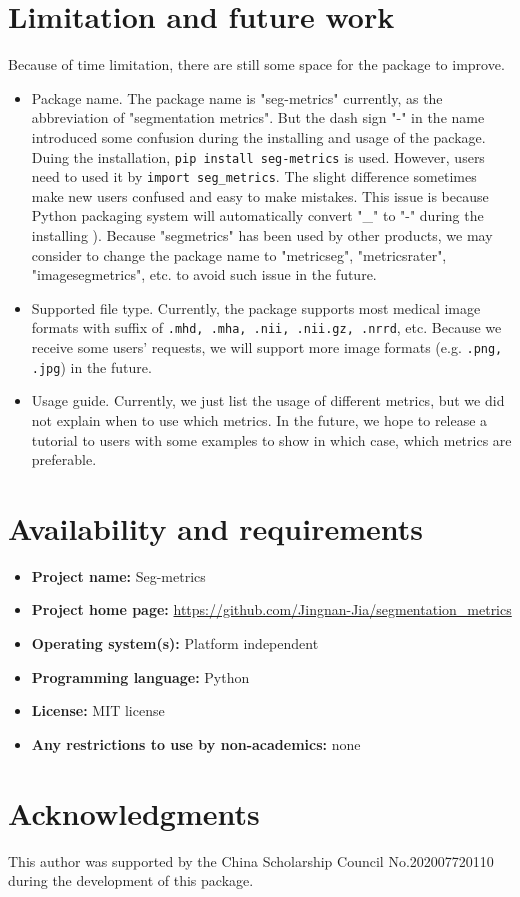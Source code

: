 \section{Limitation and future work}
Because of time limitation, there are still some space for the package to improve. 
\begin{itemize}
    \item Package name. The package name is "seg-metrics" currently, as the abbreviation of "segmentation metrics". But the dash sign "-" in the name introduced some confusion during the installing and usage of the package. Duing the installation, \texttt{pip install seg-metrics} is used. However, users need to used it by \texttt{import seg\_metrics}. The slight difference sometimes make new users confused and easy to make mistakes. This issue is because Python packaging system will automatically convert "\_" to "-" during the installing \cite{dash_underscore_email, dash_underscore_google, dash_underscore_overflow}). Because "segmetrics" has been used by other products, we may consider to change the package name to "metricseg", "metricsrater", "imagesegmetrics", etc. to avoid such issue in the future.
    
    \item Supported file type. Currently, the package supports most medical image formats with suffix of \texttt{.mhd, .mha, .nii, .nii.gz, .nrrd}, etc. Because we receive some users' requests, we will support more image formats (e.g. \texttt{.png, .jpg}) in the future.

    \item Usage guide. Currently, we just list the usage of different metrics, but we did not explain when to use which metrics. In the future, we hope to release a tutorial to users with some examples to show in which case, which metrics are preferable.
    
\end{itemize}


\section{Availability and requirements}
\begin{itemize}
    \item \textbf{Project name:} Seg-metrics
    \item \textbf{Project home page:} \url{https://github.com/Jingnan-Jia/segmentation_metrics}
    \item \textbf{Operating system(s):} Platform independent
    \item \textbf{Programming language:} Python
    \item \textbf{License:} MIT license
    \item \textbf{Any restrictions to use by non-academics:} none
\end{itemize}

\section*{Acknowledgments}
This author was supported by the China Scholarship Council No.202007720110 during the development of this package.
